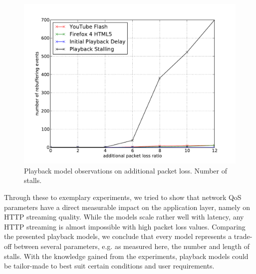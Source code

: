 \begin{figure}[htb]
    \centering
    \includegraphics[width=\textwidth]{images/eval-loss4mb-frequency.pdf}
    \caption{Playback model observations on additional packet loss. Number of stalls.}
    \label{c3:fig:eval-loss-numstalls}
\end{figure}
 
Through these to exemplary experiments, we tried to show that network QoS parameters have a direct measurable impact on the application layer, namely on HTTP streaming quality. While the models scale rather well with latency, any HTTP streaming is almost impossible with high packet loss values.
Comparing the presented playback models, we conclude that every model represents a trade-off between several parameters, e.g. as measured here, the number and length of stalls. With the knowledge gained from the experiments, playback models could be tailor-made to best suit certain conditions and user requirements. 



	

